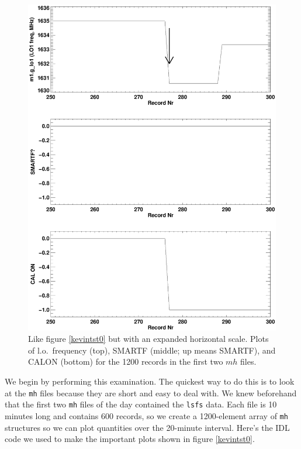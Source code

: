 \documentclass[psfig,preprint]{aastex}
\begin{document}
{\begin{figure}[!p]
\begin{center}
\includegraphics[width=6in]{kevintst1.ps}
\end{center}
\caption{Like figure \ref{kevintst0} but with an expanded horizontal
scale. Plots of l.o.\ frequency (top), SMARTF (middle; up means
SMARTF), and CALON (bottom) for the 1200 records in the first two
$mh$ files. \label{kevintst1}}
\end{figure}

	We begin by performing this examination. The quickest way to do
this is to look at the \verb$mh$ files because they are short and easy
to deal with. We knew beforehand that the first two \verb$mh$ files of
the day contained the \verb$lsfs$ data. Each file is 10 minutes long and
contains 600 records, so we create a 1200-element array of \verb$mh$ structures
so we can plot quantities over the 20-minute interval. Here's the IDL
code we used to make the important plots shown in figure \ref{kevintst0}.

}
\end{document}
